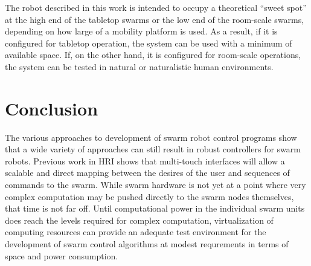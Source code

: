 \documentclass[]{article}
\begin{document}
The robot described in this work is intended to occupy a theoretical ``sweet spot'' at the high end of the tabletop swarms or the low end of the room-scale swarms, depending on how large of a mobility platform is used. 
As a result, if it is configured for tabletop operation, the system can be used with a minimum of available space. 
If, on the other hand, it is configured for room-scale operations, the system can be tested in natural or naturalistic human environments. 

\section{Conclusion}

The various approaches to development of swarm robot control programs show that a wide variety of approaches can still result in robust controllers for swarm robots. 
Previous work in HRI shows that multi-touch interfaces will allow a scalable and direct mapping between the desires of the user and sequences of commands to the swarm. 
While swarm hardware is not yet at a point where very complex computation may be pushed directly to the swarm nodes themselves, that time is not far off. 
Until computational power in the individual swarm units does reach the levels required for complex computation, virtualization of computing resources can provide an adequate test environment for the development of swarm control algorithms at modest requrements in terms of space and power consumption. 



\end{document}
